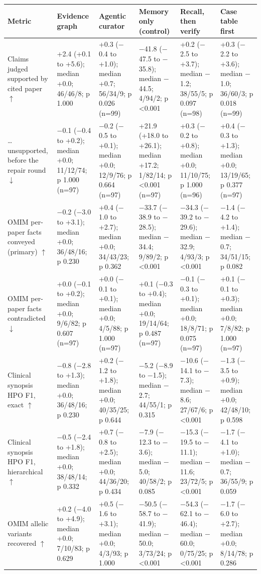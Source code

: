 \documentclass{article} %
\begin{document}
\begin{table}[!htbp]
\begin{tabularx}{\linewidth}{>{\raggedright\arraybackslash}p{2.2cm}>{\centering\arraybackslash}X>{\centering\arraybackslash}X>{\centering\arraybackslash}X>{\centering\arraybackslash}X>{\centering\arraybackslash}X}
\toprule
Metric & Evidence graph & Agentic curator & Memory only (control) & Recall, then verify & Case table first \\
\midrule
Claims judged supported by cited paper $\uparrow$ & +2.4 (+0.1 to +5.6); median +0.0; 46/46/8; p 1.000 & +0.3 ($-$0.4 to +1.0); median +0.7; 56/34/9; p 0.026 (n=99) & $-$41.8 ($-$47.5 to $-$35.8); median $-$44.5; 4/94/2; p <0.001 & +0.2 ($-$2.5 to +3.7); median $-$1.2; 38/55/5; p 0.097 (n=98) & +0.3 ($-$2.2 to +3.6); median $-$1.0; 36/60/3; p 0.018 (n=99) \\
\ldots{} unsupported, before the repair round $\downarrow$ & $-$0.1 ($-$0.4 to +0.2); median +0.0; 11/12/74; p 1.000 (n=97) & $-$0.2 ($-$0.5 to +0.1); median +0.0; 12/9/76; p 0.664 (n=97) & +21.9 (+18.0 to +26.1); median +17.2; 1/82/14; p <0.001 (n=97) & +0.3 ($-$0.2 to +0.8); median +0.0; 11/10/75; p 1.000 (n=96) & +0.4 ($-$0.3 to +1.3); median +0.0; 13/19/65; p 0.377 (n=97) \\
OMIM per-paper facts conveyed (primary) $\uparrow$ & $-$0.2 ($-$3.0 to +3.1); median +0.0; 36/48/16; p 0.230 & +0.4 ($-$1.0 to +2.7); median +0.0; 34/43/23; p 0.362 & $-$33.7 ($-$38.9 to $-$28.5); median $-$34.4; 9/89/2; p <0.001 & $-$34.3 ($-$39.2 to $-$29.6); median $-$32.9; 4/93/3; p <0.001 & $-$1.4 ($-$4.2 to +1.4); median $-$0.7; 34/51/15; p 0.082 \\
OMIM per-paper facts contradicted $\downarrow$ & +0.0 ($-$0.1 to +0.2); median +0.0; 9/6/82; p 0.607 (n=97) & +0.0 ($-$0.1 to +0.1); median +0.0; 4/5/88; p 1.000 (n=97) & +0.1 ($-$0.3 to +0.4); median +0.0; 19/14/64; p 0.487 (n=97) & $-$0.1 ($-$0.3 to +0.1); median +0.0; 18/8/71; p 0.075 (n=97) & +0.1 ($-$0.1 to +0.3); median +0.0; 7/8/82; p 1.000 (n=97) \\
Clinical synopsis HPO F1, exact $\uparrow$ & $-$0.8 ($-$2.8 to +1.3); median +0.0; 36/48/16; p 0.230 & +0.2 ($-$1.2 to +1.8); median +0.0; 40/35/25; p 0.644 & $-$5.2 ($-$8.9 to $-$1.5); median $-$2.7; 44/55/1; p 0.315 & $-$10.6 ($-$14.1 to $-$7.3); median $-$8.6; 27/67/6; p <0.001 & $-$1.3 ($-$3.5 to +0.9); median +0.0; 42/48/10; p 0.598 \\
Clinical synopsis HPO F1, hierarchical $\uparrow$ & $-$0.5 ($-$2.4 to +1.8); median +0.0; 38/48/14; p 0.332 & +0.7 ($-$0.8 to +2.5); median +0.0; 44/36/20; p 0.434 & $-$7.9 ($-$12.3 to $-$3.6); median $-$5.0; 40/58/2; p 0.085 & $-$15.3 ($-$19.5 to $-$11.1); median $-$11.6; 23/72/5; p <0.001 & $-$1.7 ($-$4.1 to +1.0); median $-$0.7; 36/55/9; p 0.059 \\
OMIM allelic variants recovered $\uparrow$ & +0.2 ($-$4.0 to +4.9); median +0.0; 7/10/83; p 0.629 & +0.5 ($-$1.6 to +3.1); median +0.0; 4/3/93; p 1.000 & $-$50.5 ($-$58.7 to $-$41.9); median $-$50.0; 3/73/24; p <0.001 & $-$54.3 ($-$62.1 to $-$46.4); median $-$60.0; 0/75/25; p <0.001 & $-$1.7 ($-$6.0 to +2.7); median +0.0; 8/14/78; p 0.286 \\

\end{tabularx}
\end{table}
\end{document}
